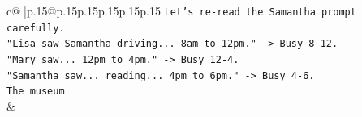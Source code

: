 \documentclass{article}
\begin{document}
{\begin{supertabular}{c@{$\;$}|p{.15\linewidth}@{}p{.15\linewidth}p{.15\linewidth}p{.15\linewidth}p{.15\linewidth}p{.15\linewidth}}
{{{\texttt{Let's re{-}read the Samantha prompt carefully.} \\
\texttt{"Lisa saw Samantha driving... 8am to 12pm." {-}> Busy 8{-}12.} \\
\texttt{"Mary saw... 12pm to 4pm." {-}> Busy 12{-}4.} \\
\texttt{"Samantha saw... reading... 4pm to 6pm." {-}> Busy 4{-}6.} \\
\texttt{The museum} \\
            }
        }
    }
    & \\ \\

\end{supertabular}
}
\end{document}
